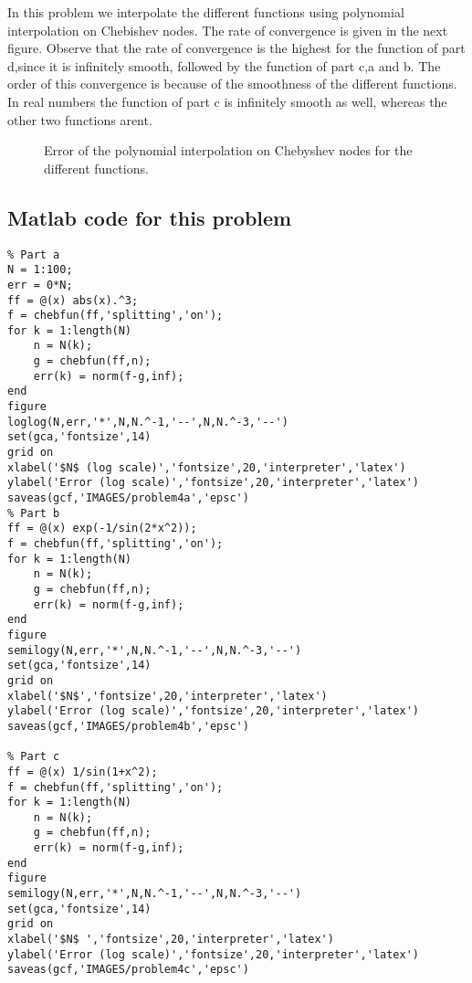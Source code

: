 \begin{solution}
In this problem we interpolate the different functions using polynomial interpolation on Chebishev nodes. The rate of convergence is given in the next figure. Observe that the rate of convergence is the highest for the function of part d,since it is infinitely smooth, followed by the function of part c,a and b. The order of this convergence is because of the smoothness of the different functions. In real numbers the function of part c is infinitely smooth as well, whereas the other two functions arent.
\begin{figure}[H]
\centering     %
\hspace*{\fill}
\hfill
{}
\hspace*{\fill}

\hspace*{\fill}
\hfill
{}
\hspace*{\fill}
\caption{Error of the polynomial interpolation on Chebyshev nodes for the different functions.}
\end{figure}
\subsection*{Matlab code for this problem}
\begin{verbatim}
% Part a
N = 1:100;
err = 0*N;
ff = @(x) abs(x).^3;
f = chebfun(ff,'splitting','on');
for k = 1:length(N)
    n = N(k);
    g = chebfun(ff,n);
    err(k) = norm(f-g,inf);
end
figure
loglog(N,err,'*',N,N.^-1,'--',N,N.^-3,'--')
set(gca,'fontsize',14)
grid on
xlabel('$N$ (log scale)','fontsize',20,'interpreter','latex')
ylabel('Error (log scale)','fontsize',20,'interpreter','latex')
saveas(gcf,'IMAGES/problem4a','epsc')
% Part b
ff = @(x) exp(-1/sin(2*x^2));
f = chebfun(ff,'splitting','on');
for k = 1:length(N)
    n = N(k);
    g = chebfun(ff,n);
    err(k) = norm(f-g,inf);
end
figure
semilogy(N,err,'*',N,N.^-1,'--',N,N.^-3,'--')
set(gca,'fontsize',14)
grid on
xlabel('$N$','fontsize',20,'interpreter','latex')
ylabel('Error (log scale)','fontsize',20,'interpreter','latex')
saveas(gcf,'IMAGES/problem4b','epsc')

% Part c
ff = @(x) 1/sin(1+x^2);
f = chebfun(ff,'splitting','on');
for k = 1:length(N)
    n = N(k);
    g = chebfun(ff,n);
    err(k) = norm(f-g,inf);
end
figure
semilogy(N,err,'*',N,N.^-1,'--',N,N.^-3,'--')
set(gca,'fontsize',14)
grid on
xlabel('$N$ ','fontsize',20,'interpreter','latex')
ylabel('Error (log scale)','fontsize',20,'interpreter','latex')
saveas(gcf,'IMAGES/problem4c','epsc')


\end{verbatim}
\end{solution}
